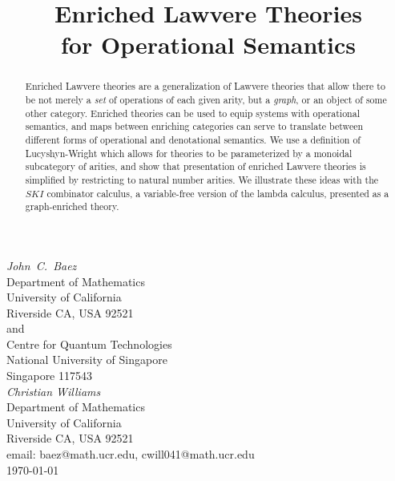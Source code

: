 \documentclass{amsart}
\theoremstyle{definition}
\begin{document}


\title{Enriched Lawvere Theories \\
for Operational Semantics}

\maketitle
\begin{center}   
  {\em John\ C.\ Baez \\}
  \vspace{0.3cm}
  {\small
 Department of Mathematics \\
    University of California \\
  Riverside CA, USA 92521 \\ and \\
 Centre for Quantum Technologies  \\
    National University of Singapore \\
    Singapore 117543  \\    } 
  \vspace{0.4cm}
{\em Christian Williams \\}
\vspace{0.3cm}
   {\small
   Department of Mathematics \\
  University of California \\
  Riverside CA, USA 92521 \\}
  \vspace{0.3cm}   
  {\small email:  baez@math.ucr.edu, cwill041@math.ucr.edu\\} 
  \vspace{0.3cm}   
  {\small \today}
  \vspace{0.3cm}   
\end{center} 

\begin{abstract} 
Enriched Lawvere theories are a generalization of Lawvere theories that allow there to be not merely a \emph{set} of operations of each given arity, but a \emph{graph}, or an object of some other category. Enriched theories can be used to equip systems with operational semantics, and maps between enriching categories can serve to translate between different forms of operational and denotational semantics. We use a definition of Lucyshyn-Wright which allows for theories to be parameterized by a monoidal subcategory of arities, and show that presentation of enriched Lawvere theories is simplified by restricting to natural number arities. We illustrate these ideas with the $SKI$ combinator calculus, a variable-free version of the lambda calculus, presented as a graph-enriched theory.  
\end{abstract}
\end{document}
